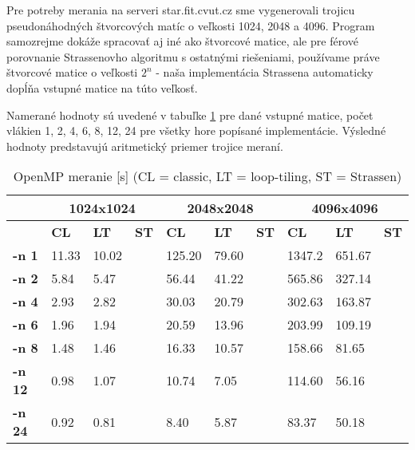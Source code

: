 \documentclass[slovak]{article}
\begin{document}
Pre potreby merania na serveri star.fit.cvut.cz sme vygenerovali trojicu pseudonáhodných štvorcových matíc o veľkosti 1024, 2048 a 4096. Program samozrejme dokáže spracovať aj iné ako štvorcové matice, ale pre férové porovnanie Strassenovho algoritmu s ostatnými riešeniami, používame práve štvorcové matice o veľkosti  $2^n$ - naša implementácia Strassena automaticky dopĺňa vstupné matice na túto veľkosť.

Namerané hodnoty sú uvedené v tabuľke \ref{tab1} pre dané vstupné matice, počet vlákien 1, 2, 4, 6, 8, 12, 24 pre všetky hore popísané implementácie. Výsledné hodnoty predstavujú aritmetický priemer trojice meraní.

	\begin{table}\centering
		\begin{tabularx}{\textwidth}{|X|X|X|X|X|X|X|X|X|X|}
			\hline                        
			& \multicolumn{3}{|c|}{\textbf{1024x1024}} & \multicolumn{3}{|c|}{\textbf{2048x2048}} & \multicolumn{3}{|c|}{\textbf{4096x4096}} \\ \hline
			& \textbf{CL} & \textbf{LT} & \textbf{ST} & \textbf{CL} & \textbf{LT} & \textbf{ST} & \textbf{CL} & \textbf{LT} & \textbf{ST} \\ \hline
			\textbf{-n 1} & 11.33	& 10.02 &  & 125.20 & 79.60 &  & 1347.2 & 651.67 & \\ \hline
			\textbf{-n 2} & 5.84	& 5.47 &  & 56.44 & 41.22 &  & 565.86 & 327.14 & \\ \hline
			\textbf{-n 4} & 2.93	& 2.82 &  & 30.03 & 20.79 &  & 302.63 & 163.87 & \\ \hline
			\textbf{-n 6} & 1.96	& 1.94 &  & 20.59 & 13.96 &  & 203.99 & 109.19 & \\ \hline
			\textbf{-n 8} & 1.48	& 1.46 &  & 16.33 & 10.57 &  & 158.66 & 81.65 & \\ \hline
			\textbf{-n 12} & 0.98	& 1.07 &  & 10.74 & 7.05 &  & 114.60 & 56.16 & \\ \hline
			\textbf{-n 24} & 0.92	& 0.81 &  & 8.40 & 5.87 &  & 83.37 & 50.18 & \\ \hline
		\end{tabularx}
	\caption{OpenMP meranie [s]
	 (CL = classic, LT = loop-tiling, ST = Strassen)}
	\label{tab1}
	\end{table}
\end{document}
